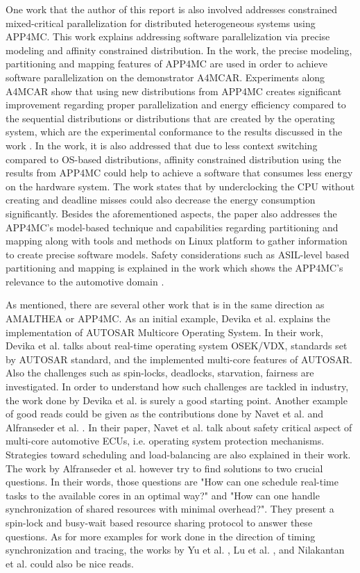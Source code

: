 One work that the author of this report is also involved \cite{constrainedpaper} addresses constrained mixed-critical parallelization for distributed heterogeneous systems using APP4MC. This work explains addressing software parallelization via precise modeling and affinity constrained distribution. In the work, the precise modeling, partitioning and mapping features of APP4MC are used in order to achieve software parallelization on the demonstrator A4MCAR. Experiments along A4MCAR show that using new distributions from APP4MC creates significant improvement regarding proper parallelization and energy efficiency compared to the sequential distributions or distributions that are created by the operating system, which are the experimental conformance to the results discussed in the work \cite{priorpaperapp4mc}. In the work, it is also addressed that due to less context switching compared to OS-based distributions, affinity constrained distribution using the results from APP4MC could help to achieve a software that consumes less energy on the hardware system. The work states that by underclocking the CPU without creating and deadline misses could also decrease the energy consumption significantly. Besides the aforementioned aspects, the paper \cite{constrainedpaper} also addresses the APP4MC's model-based technique and capabilities regarding partitioning and mapping along with tools and methods on Linux platform to gather information to create precise software models. Safety considerations such as ASIL-level based partitioning and mapping is explained in the work which shows the APP4MC's relevance to the automotive domain \cite{constrainedpaper}.

As mentioned, there are several other work that is in the same direction as AMALTHEA or APP4MC. As an initial example, Devika et al. \cite{autosarospaper1} explains the implementation of AUTOSAR Multicore Operating System. In their work, Devika et al. talks about real-time operating system OSEK/VDX, standards set by AUTOSAR standard, and the implemented multi-core features of AUTOSAR. Also the challenges such as spin-locks, deadlocks, starvation, fairness are investigated. In order to understand how such challenges are tackled in industry, the work done by Devika et al. is surely a good starting point. Another example of good reads could be given as the contributions done by Navet et al. \cite{paper2} and Alfranseder et al. \cite{paper3}. In their paper, Navet et al. talk about safety critical aspect of multi-core automotive ECUs, i.e. operating system protection mechanisms. Strategies toward scheduling and load-balancing are also explained in their work. The work by Alfranseder et al. \cite{paper3} however try to find solutions to two crucial questions. In their words, those questions are "How can one schedule real-time tasks to the available cores in an optimal way?" and "How can one handle synchronization of shared resources with minimal overhead?". They present a spin-lock and busy-wait based resource sharing protocol to answer these questions. As for more examples for work done in the direction of timing synchronization and tracing, the works by Yu et al. \cite{paper4}, Lu et al. \cite{paper5}, and Nilakantan et al. \cite{paper6} could also be nice reads.
\newpage
